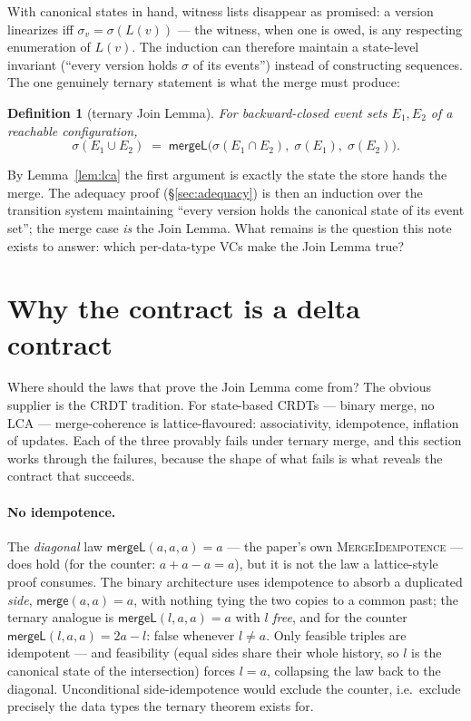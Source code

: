 \documentclass[11pt]{article}
\newtheorem{definition}[theorem]{Definition}
\newcommand{\Merge}{\mathsf{merge}}
\newcommand{\mergeL}{\mathsf{mergeL}}
\begin{document}
With canonical states in hand, witness lists disappear as promised: a
version linearizes iff $\sigma_v = \sigma(L(v))$ --- the witness, when
one is owed, is any respecting enumeration of $L(v)$. The induction can
therefore maintain a state-level invariant (``every version holds
$\sigma$ of its events'') instead of constructing sequences. The one
genuinely ternary statement is what the merge must produce:

\begin{definition}[ternary Join Lemma]
For backward-closed event sets $E_1, E_2$ of a reachable configuration,
\[
  \sigma(E_1 \cup E_2)
  \;=\;
  \mergeL\bigl(\sigma(E_1 \cap E_2),\; \sigma(E_1),\; \sigma(E_2)\bigr).
\]
\end{definition}

By Lemma~\ref{lem:lca} the first argument is exactly the state the store
hands the merge. The adequacy proof (\S\ref{sec:adequacy}) is then an
induction over the transition system maintaining ``every version holds the
canonical state of its event set''; the merge case \emph{is} the Join
Lemma. What remains is the question this note exists to answer: which
per-data-type VCs make the Join Lemma true?

\section{Why the contract is a delta contract}
\label{sec:whydelta}

Where should the laws that prove the Join Lemma come from? The obvious
supplier is the CRDT tradition. For state-based CRDTs --- binary merge,
no LCA --- merge-coherence is lattice-flavoured: associativity,
idempotence, inflation of updates. Each of the three provably fails
under ternary merge, and this section works through the failures,
because the shape of what fails is what reveals the contract that
succeeds.

\paragraph{No idempotence.} The \emph{diagonal} law
$\mergeL(a,a,a) = a$ --- the paper's own \textsc{MergeIdempotence} ---
does hold (for the counter: $a + a - a = a$), but it is not the law a
lattice-style proof consumes. The binary architecture uses idempotence
to absorb a duplicated \emph{side}, $\Merge(a,a) = a$, with nothing
tying the two copies to a common past; the ternary analogue is
$\mergeL(l,a,a) = a$ with $l$ \emph{free}, and for the counter
$\mergeL(l,a,a) = 2a - l$: false whenever $l \neq a$. Only feasible
triples are idempotent --- and feasibility (equal sides share their
whole history, so $l$ is the canonical state of the intersection)
forces $l = a$, collapsing the law back to the diagonal. Unconditional
side-idempotence would exclude the counter, i.e.\ exclude precisely the
data types the ternary theorem exists for.
\end{document}
